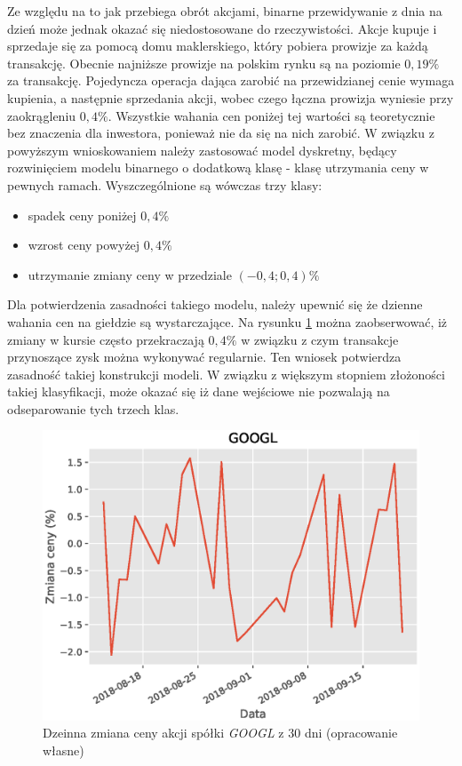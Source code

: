 \documentclass[a4paper, twoside, 11pt, openright]{article}
\begin{document}
Ze względu na to jak przebiega obrót akcjami, binarne przewidywanie z dnia na dzień może jednak okazać się niedostosowane do rzeczywistości. Akcje kupuje i sprzedaje się za pomocą domu maklerskiego, który pobiera prowizje za każdą transakcję. Obecnie najniższe prowizje na polskim rynku są na poziomie $0,19\%$ za transakcję. Pojedyncza operacja dająca zarobić na przewidzianej cenie wymaga kupienia, a następnie sprzedania akcji, wobec czego łączna prowizja wyniesie przy zaokrągleniu $0,4\%$. Wszystkie wahania cen poniżej tej wartości są teoretycznie bez znaczenia dla inwestora, ponieważ nie da się na nich zarobić. W związku z powyższym wnioskowaniem należy zastosować model dyskretny, będący rozwinięciem modelu binarnego o dodatkową klasę - klasę utrzymania ceny w pewnych ramach. Wyszczególnione są wówczas trzy klasy:
\begin{itemize}
\item spadek ceny poniżej $0,4\%$
\item wzrost ceny powyżej $0,4\%$
\item utrzymanie zmiany ceny w przedziale $(-0,4; 0,4)\%$
\end{itemize}

Dla potwierdzenia zasadności takiego modelu, należy upewnić się że dzienne wahania cen na giełdzie są wystarczające. Na rysunku \ref{l_r_pct_change_last_30} można zaobserwować, iż zmiany w kursie często przekraczają $0,4\%$ w związku z czym transakcje przynoszące zysk można wykonywać regularnie. Ten wniosek potwierdza zasadność takiej konstrukcji modeli. W związku z większym stopniem złożoności takiej klasyfikacji, może okazać się iż dane wejściowe nie pozwalają na odseparowanie tych trzech klas. 

\begin{figure}[H]
\centering \includegraphics[scale=0.9]{img/linear_regression/l_r_pct_change_last_30}
\caption{Dzeinna zmiana ceny akcji spółki \textit{GOOGL} z 30 dni (opracowanie własne)}
\label{l_r_pct_change_last_30}
\end{figure}
\end{document}
